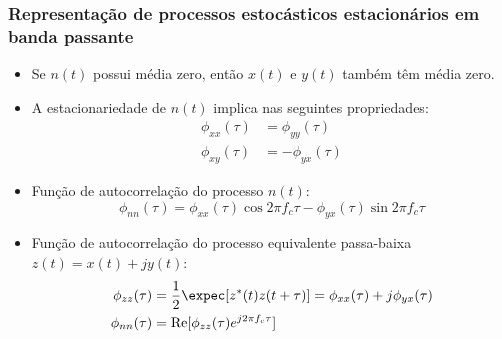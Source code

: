 \begin{frame}
	\frametitle{Representação de processos estocásticos estacionários em banda passante}

	\begin{itemize}
		\item Se $n(t)$ possui média zero, então $x(t)$ e $y(t)$ também têm média zero.
		\item A estacionariedade de $n(t)$ implica nas seguintes propriedades:
		\begin{align*}
			\phi_{xx}(\tau) &= \phi_{yy}(\tau) \\
			\phi_{xy}(\tau) &= -\phi_{yx}(\tau) 
		\end{align*}
		\item Função de autocorrelação do processo $n(t)$:
		\begin{equation*}
			\phi_{nn}(\tau) = \phi_{xx}(\tau)\cos 2\pi f_c \tau - \phi_{yx}(\tau)\sin 2\pi f_c \tau
		\end{equation*}
		\item Função de autocorrelação do processo equivalente passa-baixa $z(t) = x(t) + jy(t)$:
		\begin{align*}
			\phi_{zz}(\tau) &= \frac{1}{2} \expec[z^*(t) z(t+\tau)] = \phi_{xx}(\tau) + j\phi_{yx}(\tau) \\
			\phi_{nn}(\tau) &= \mathrm{Re}[\phi_{zz}(\tau)e^{j2\pi f_c \tau}]
		\end{align*}
	\end{itemize}

\end{frame}

